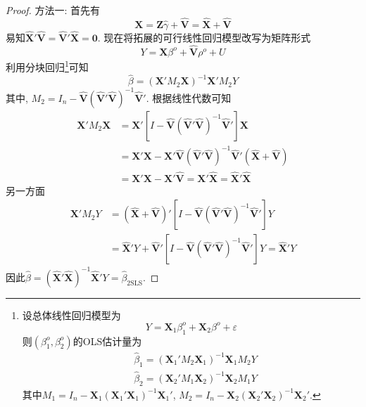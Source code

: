 \documentclass[cn,12pt,math=mtpro2,citestyle=gb7714-2015,bibstyle=gb7714-2015,twocol,mode=simple]{elegantbook}
\newcommand{\btls}{\hat{\beta}_{\text{2SLS}}}
\newcommand{\HV}{\hat{\mathbf{V}}}
\newcommand{\X}{\mathbf{X}}
\begin{document}
\begin{proof}
  方法一: 首先有
  $$\X=\mathbf{Z}\hat{\gamma}+\HV=\hat{\X}+\HV$$
  易知$\hat{\X}'\HV=\HV'\hat{\X}=\mathbf{0}$. 现在将拓展的可行线性回归模型改写为矩阵形式
  $$Y=\mathbf{X}\beta^o+\hat{\mathbf{V}}\rho^o+U$$
  利用分块回归\footnote{设总体线性回归模型为
  $$Y=\X_1\beta_1^o+\X_2\beta^o+\varepsilon$$
  则$(\beta_1^o,\beta_2^o)$的OLS估计量为
  \begin{align*}
  &\hat{\beta}_1=(\X_1'M_2\X_1)^{-1}\X_1M_2Y \\
  &\hat{\beta}_2=(\X_2'M_1\X_2)^{-1}\X_2M_1Y
  \end{align*}
  其中$M_1=I_n-\X_1(\X_1'\X_1)^{-1}\X_1'$, $M_2=I_n-\X_2(\X_2'\X_2)^{-1}\X_2'$.}可知
  $$\hat{\beta}=(\mathbf{X}'M_2\mathbf{X})^{-1}\mathbf{X}'M_2Y$$
  其中, $M_2=I_n-\HV(\HV{'}\HV)^{-1}\HV{'}$. 根据线性代数可知
  \begin{align*}
  \mathbf{X}'M_2\mathbf{X}&=\mathbf{X}'[I-\HV(\HV'\HV)^{-1}\HV']\mathbf{X} \\
  &=\X'\X-\X'\HV(\HV'\HV)^{-1}\HV'(\hat{\X}+\HV) \\
  &=\X'\X-\X'\HV=\X'\hat{\X}=\hat{\X}'\hat{\X}
  \end{align*}
  另一方面
  \begin{align*}
  \X'M_2Y&=(\hat{\X}+\HV)'[I-\HV(\HV'\HV)^{-1}\HV']Y \\
  &=\hat{\X}'Y+\HV'[I-\HV(\HV'\HV)^{-1}\HV']Y=\hat{\X}'Y
  \end{align*}
  因此$\hat{\beta}=(\hat{\X}'\hat{\X})^{-1}\hat{\X}'Y=\btls$.


\end{proof}
\end{document}

